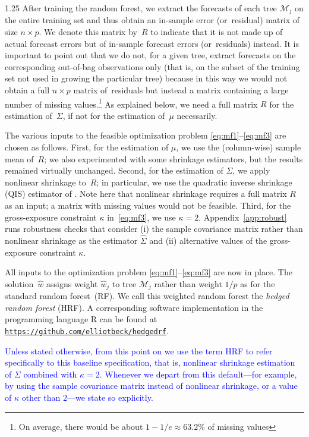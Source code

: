 \documentclass[12pt]{article}
\newcommand{\M}{\mathcal M}
\numberwithin{equation}{section}
\theoremstyle{plain}
\begin{document}
\begin{spacing}{1.25}
After training the random forest, we extract the forecasts of each
tree $\M_j$ on the entire training set and thus obtain an in-sample
error (or~residual) matrix of size $n \times p$. We denote this matrix
by~$R$ to indicate that it is not made up of actual forecast errors
but of in-sample forecast errors (or~residuals) instead.
It is important to
point out that we do not, for a given tree, extract forecasts on the corresponding
out-of-bag observations only (that is, on the subset of the training set
not used in growing the particular tree) because in this way we would
not obtain a full $n \times p$ matrix of~residuals but instead a
matrix containing a large number of missing values.\footnote{On average,
there would be about $1 - 1/e \approx 63.2\%$ of missing values}
As explained below, we need a
full matrix $R$ for the estimation of~$\Sigma$, if not for the estimation
of~$\mu$ necessarily.

The various inputs to the feasible optimization problem
\eqref{eq:mf1}--\eqref{eq:mf3} are chosen as follows.
First, for the estimation of $\mu$, we use the (column-wise) sample
mean of~$R$; we
also experimented with some shrinkage estimators, but the
results remained virtually unchanged.
Second, for the estimation of $\Sigma$, we apply nonlinear shrinkage to~$R$; in
particular, we use the quadratic
inverse shrinkage (QIS) estimator of
\cite{ledoit:wolf:2022}.
Note here that nonlinear shrinkage requires a full 
matrix $R$ as an input; a matrix with missing values would not be feasible.
Third, for the gross-exposure constraint $\kappa$ in~\eqref{eq:mf3}, we use
$\kappa = 2$. Appendix~\ref{app:robust}
runs robustness checks that
consider (i) the sample covariance matrix rather than
nonlinear shrinkage as the estimator $\hat \Sigma$ and (ii) alternative
values of the gross-exposure constraint $\kappa$.

All inputs to the
optimization problem \eqref{eq:mf1}--\eqref{eq:mf3} are now in place.
The solution~$\hat w$
assigns weight $\hat w_j$ to tree $\M_j$ rather than weight
$1/p$ as for the standard random forest~(RF). We call this weighted random
forest the {\em hedged random forest} (HRF). A corresponding software implementation in the programming language {\sc R} can be found at
\href{https://github.com/elliotbeck/hedgedrf}{{\tt https://github.com/elliotbeck/hedgedrf}}.

\textcolor{blue}{Unless stated otherwise, from this point on we use the term HRF to
refer specifically to this baseline specification, that is, nonlinear
shrinkage estimation of $\Sigma$ combined with $\kappa = 2$. Whenever we
depart from this default---for example, by using the sample covariance
matrix instead of nonlinear shrinkage, or a value of $\kappa$ other than
$2$---we state so explicitly.}



\end{spacing}
\end{document}
